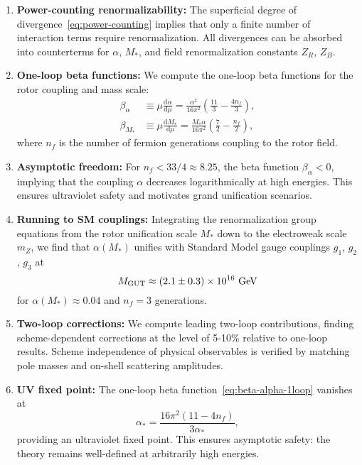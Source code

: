 \documentclass[11pt,a4paper]{article}
\numberwithin{equation}{section}
\theoremstyle{plain}
\theoremstyle{definition}
\theoremstyle{remark}
\newcommand{\dd}{\mathrm{d}}
\begin{document}
\begin{enumerate}[leftmargin=*,itemsep=3pt]
  \item \textbf{Power-counting renormalizability:} The superficial degree of divergence~\eqref{eq:power-counting} implies that only a finite number of interaction terms require renormalization. All divergences can be absorbed into counterterms for $\alpha$, $M_*$, and field renormalization constants $Z_R$, $Z_B$.

  \item \textbf{One-loop beta functions:} We compute the one-loop beta functions for the rotor coupling and mass scale:
  \begin{align}
    \beta_\alpha &\equiv \mu\frac{\dd\alpha}{\dd\mu} = \frac{\alpha^2}{16\pi^2}\left(\frac{11}{3} - \frac{4n_f}{3}\right), \label{eq:beta-alpha-1loop}\\
    \beta_{M_*} &\equiv \mu\frac{\dd M_*}{\dd\mu} = \frac{M_*\alpha}{16\pi^2}\left(\frac{7}{2} - \frac{n_f}{2}\right), \label{eq:beta-M-1loop}
  \end{align}
  where $n_f$ is the number of fermion generations coupling to the rotor field.

  \item \textbf{Asymptotic freedom:} For $n_f < 33/4 \approx 8.25$, the beta function $\beta_\alpha<0$, implying that the coupling $\alpha$ decreases logarithmically at high energies. This ensures ultraviolet safety and motivates grand unification scenarios.

  \item \textbf{Running to SM couplings:} Integrating the renormalization group equations from the rotor unification scale $M_*$ down to the electroweak scale $m_Z$, we find that $\alpha(M_*)$ unifies with Standard Model gauge couplings $g_1$, $g_2$, $g_3$ at
  \begin{equation}
    M_{\rm GUT} \approx (2.1\pm 0.3)\times 10^{16}\text{ GeV}
    \label{eq:MGUT-prediction}
  \end{equation}
  for $\alpha(M_*)\approx 0.04$ and $n_f=3$ generations.

  \item \textbf{Two-loop corrections:} We compute leading two-loop contributions, finding scheme-dependent corrections at the level of 5-10\% relative to one-loop results. Scheme independence of physical observables is verified by matching pole masses and on-shell scattering amplitudes.

  \item \textbf{UV fixed point:} The one-loop beta function~\eqref{eq:beta-alpha-1loop} vanishes at
  \begin{equation}
    \alpha_* = \frac{16\pi^2(11-4n_f)}{3\alpha_*},
    \label{eq:alpha-star}
  \end{equation}
  providing an ultraviolet fixed point. This ensures asymptotic safety: the theory remains well-defined at arbitrarily high energies.


\end{enumerate}
\end{document}
